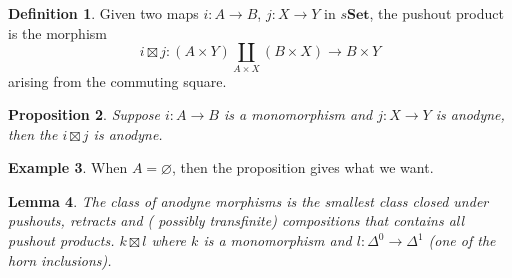 \documentclass{article}
\theoremstyle{definition}
\newtheorem{defn}{Definition}[section]
\newtheorem{example}[defn]{Example}
\theoremstyle{remark}
\theoremstyle{plain}
\newtheorem{lem}[defn]{Lemma}
\newtheorem{prop}[defn]{Proposition}
\newcommand{\bset}{\mathbf{Set}}
\begin{document}
\begin{defn}
    Given two maps $i:A\to B$, $j:X\to Y$ in $s\bset$, the pushout product is the morphism
    \[i\boxtimes j:(A\times Y)\coprod_{A\times X} (B\times X)\to B\times Y\]
    arising from the commuting square.
\end{defn}
\begin{prop}
    Suppose $i:A\to B$ is a monomorphism and $j:X\to Y$ is anodyne, then the $i\boxtimes j$ is anodyne.
\end{prop}
\begin{example}
    When $A=\varnothing$, then the proposition gives what we want.
\end{example}
\begin{lem}
    The class of anodyne morphisms is the smallest class closed under pushouts, retracts and ( possibly transfinite) compositions that contains all pushout products. $k\boxtimes l$ where $k$ is a monomorphism and $l:\Delta^0\to\Delta^1$ (one of the horn inclusions).
\end{lem}
\end{document}
